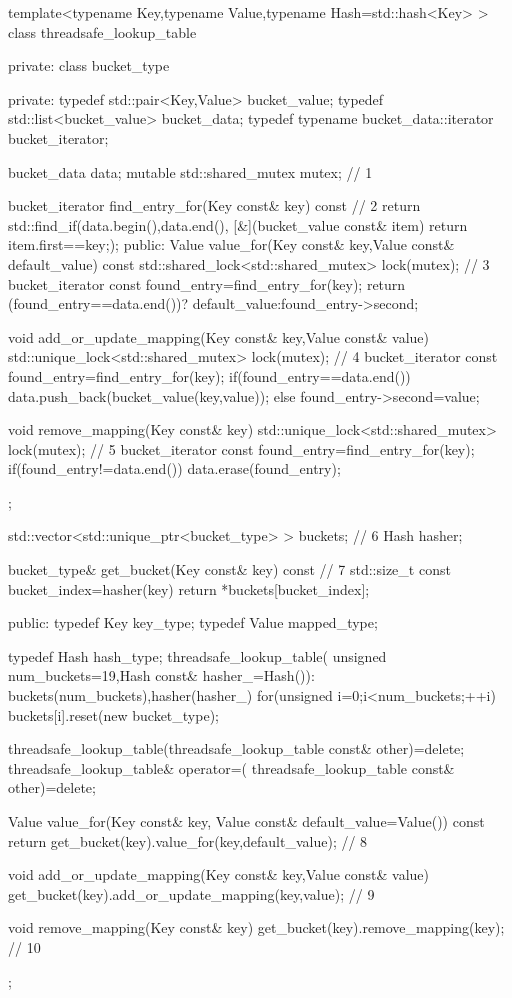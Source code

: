 \begin{cpp}
template<typename Key,typename Value,typename Hash=std::hash<Key> >
class threadsafe_lookup_table
{
private:
  class bucket_type
  {
  private:
    typedef std::pair<Key,Value> bucket_value;
    typedef std::list<bucket_value> bucket_data;
    typedef typename bucket_data::iterator bucket_iterator;

    bucket_data data;
    mutable std::shared_mutex mutex;  // 1

    bucket_iterator find_entry_for(Key const& key) const  // 2
    {
      return std::find_if(data.begin(),data.end(),
      [&](bucket_value const& item)
      {return item.first==key;});
    }
  public:
    Value value_for(Key const& key,Value const& default_value) const
    {
      std::shared_lock<std::shared_mutex> lock(mutex);  // 3
      bucket_iterator const found_entry=find_entry_for(key);
      return (found_entry==data.end())?
        default_value:found_entry->second;
    }

    void add_or_update_mapping(Key const& key,Value const& value)
    {
      std::unique_lock<std::shared_mutex> lock(mutex);  // 4
      bucket_iterator const found_entry=find_entry_for(key);
      if(found_entry==data.end())
      {
        data.push_back(bucket_value(key,value));
      }
      else
      {
        found_entry->second=value;
      }
    }

    void remove_mapping(Key const& key)
    {
      std::unique_lock<std::shared_mutex> lock(mutex);  // 5
      bucket_iterator const found_entry=find_entry_for(key);
      if(found_entry!=data.end())
      {
        data.erase(found_entry);
      }
    }
  };

  std::vector<std::unique_ptr<bucket_type> > buckets;  // 6
  Hash hasher;

  bucket_type& get_bucket(Key const& key) const  // 7
  {
    std::size_t const bucket_index=hasher(key)%
    return *buckets[bucket_index];
  }

public:
  typedef Key key_type;
  typedef Value mapped_type;

  typedef Hash hash_type;
  threadsafe_lookup_table(
    unsigned num_buckets=19,Hash const& hasher_=Hash()):
    buckets(num_buckets),hasher(hasher_)
  {
    for(unsigned i=0;i<num_buckets;++i)
    {
      buckets[i].reset(new bucket_type);
    }
  }

  threadsafe_lookup_table(threadsafe_lookup_table const& other)=delete;
  threadsafe_lookup_table& operator=(
    threadsafe_lookup_table const& other)=delete;

  Value value_for(Key const& key,
                  Value const& default_value=Value()) const
  {
    return get_bucket(key).value_for(key,default_value);  // 8
  }

  void add_or_update_mapping(Key const& key,Value const& value)
  {
    get_bucket(key).add_or_update_mapping(key,value);  // 9
  }

  void remove_mapping(Key const& key)
  {
    get_bucket(key).remove_mapping(key);  // 10
  }
};
\end{cpp}

